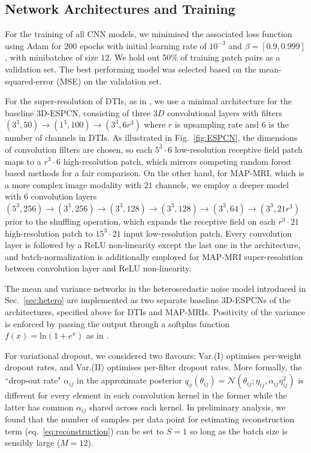 \subsection{Network Architectures and Training}
For the training of all CNN models, we minimised the associated loss function using Adam \cite{kingma2014adam} for $200$ epochs with initial learning rate of $10^{-3}$ and $\beta= [ 0.9, 0.999]$, with minibatches of size $12$. We hold out 50\% of training patch pairs as a validation set. The best performing model was selected based on the mean-squared-error (MSE) on the validation set. 

For the super-resolution of DTIs, as in \cite{shi2016real}, we use a minimal architecture for the baseline 3D-ESPCN, consisting of three $3D$ convolutional layers with filters $(3^3,50)\to(1^3,100)\to(3^3,6r^3)$ where $r$ is upsampling rate and $6$ is the number of channels in DTIs. As illustrated in Fig.~\ref{fig:ESPCN}, the dimensions of convolution filters are chosen, so each $5^3\cdot 6$ low-resolution receptive field patch maps to a $r^3 \cdot 6$ high-resolution patch, which mirrors competing random forest based methods \cite{alexander2014image,tanno2016bayesian} for a fair comparison. On the other hand, for MAP-MRI, which is a more complex image modality with $21$ channels, we employ a deeper model with 6 convolution layers $(5^3, 256)\to(3^3,256)\to(3^3,128)\to(3^3,128)\to(3^3,64)\to(3^3,21r^3)$ prior to the shuffling operation, which expands the receptive field on each $r^3\cdot21$ high-resolution patch to $15^3\cdot 21$ input low-resolution patch. Every convolution layer is followed by a ReLU non-linearity except the last one in the architecture, and batch-normalization \cite{ioffe2015batch} is additionally employed for MAP-MRI super-resolution between convolution layer and ReLU non-linearity. 

The mean and variance networks in the heteroscedastic noise model introduced in Sec.~\ref{sec:hetero} are implemented as two separate baseline 3D-ESPCNs of the architectures, specified above for DTIs and MAP-MRIs. Positivity of the variance is enforced by passing the output through a softplus function $f(x)=\text{ln}(1+e^{x})$ as in \cite{lakshminarayanan2017simple}. 

For variational dropout, we considered two flavours: Var.(I) optimises per-weight dropout rates, and Var.(II) optimises per-filter dropout rates. More formally, the ``drop-out rate" $\alpha_{ij}$ in the approximate posterior $q_\phi(\theta_{ij}) = \mathcal{N}(\theta_{ij}; \eta_{ij}, \alpha_{ij}\eta_{ij}^2)$ is different for every element in each convolution kernel in the former while the latter has common $\alpha_{ij}$ shared across each kernel. In preliminary analysis, we found that the number of samples per data point for estimating reconstruction term (eq.~\ref{eq:reconstruction}) can be set to $S=1$ so long as the batch size is sensibly large ($M=12$). 

